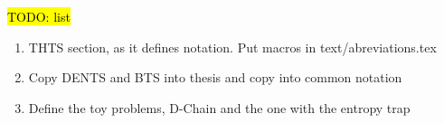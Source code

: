 \documentclass[a4paper,twoside]{ociamthesis}
\theoremstyle{plain}
\newcommand{\todo}[1]{\hl{TODO: #1}}
\newcommand{\hide}[1]{#1} %
\begin{document}
\begin{romanpages}


\maketitle

\hide{
\clearpage
  \todo{list}
  \begin{enumerate}
    \item THTS section, as it defines notation. Put macros in text/abreviations.tex 
    \item Copy DENTS and BTS into thesis and copy into common notation
    \item Define the toy problems, D-Chain and the one with the entropy trap
  \end{enumerate}
}


\begin{acknowledgements}
 	
\end{acknowledgements}

\begin{abstract}
	
\end{abstract}

\dominitoc %


\end{romanpages}
\end{document}

